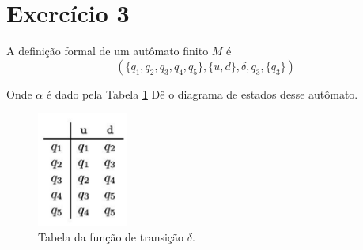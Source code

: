 \documentclass[a4paper, 12pt]{article}
\begin{document}
\newpage
\section*{Exercício 3}

A definição formal de um autômato finito $M$ é 
$$(\{q_1, q_2, q_3, q_4, q_5\}, \{u, d\}, \delta, q_3, \{q_3\})$$

Onde $\alpha$ é dado pela Tabela \ref{fig:table_delta} Dê o diagrama de estados desse autômato.

\begin{figure}[!ht]
    \centering
    \includegraphics[width=3cm]{./imgs/table_delta.png}
    \caption{Tabela da função de transição $\delta$.}
    \label{fig:table_delta}
\end{figure}


\end{document}
